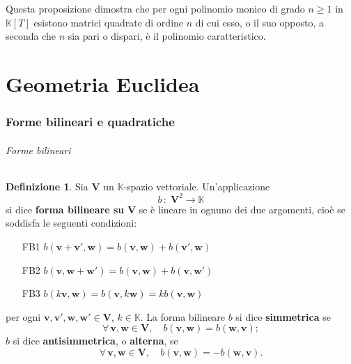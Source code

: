 \documentclass{article}
\theoremstyle{plain}
\theoremstyle{definition}
\newtheorem{defn}{Definizione}[section]
\theoremstyle{remark}
\begin{document}
Questa proposizione dimostra che per ogni polinomio monico di grado $n \geq 1$ in $\mathbb{K}[T]$ esistono 
matrici quadrate di ordine $n$ di cui esso, o il suo opposto, a seconda che $n$ sia pari o dispari, è il 
polinomio caratteristico.

\newpage
\part{Geometria Euclidea}
\newpage

\newpage
\section{Forme bilineari e quadratiche}
\vspace{20pt}

\paragraph{Forme bilineari}
\begin{bxthm}
\begin{defn}
Sia \( \mathbf{V} \) un \( \mathbb{K} \)-spazio vettoriale. Un'applicazione
\[
b \,:\; \mathbf{V}^2 \rightarrow \mathbb{K}
\]
si dice \textbf{forma bilineare su} \( \mathbf{V} \) se è lineare in ognuno dei due argomenti, cioè se soddisfa 
le seguenti condizioni:
\begin{itemize}
    \item[FB1] \( b(\mathbf{v} + \mathbf{v}', \mathbf{w}) = b(\mathbf{v}, \mathbf{w}) + b(\mathbf{v}', \mathbf{w}) \)
    \item[FB2] \( b(\mathbf{v}, \mathbf{w} + \mathbf{w}') = b(\mathbf{v}, \mathbf{w}) + b(\mathbf{v}, \mathbf{w}') \)
    \item[FB3] \( b(k\mathbf{v}, \mathbf{w}) = b(\mathbf{v}, k\mathbf{w}) = kb(\mathbf{v}, \mathbf{w}) \)
\end{itemize}
per ogni \( \mathbf{v}, \mathbf{v}', \mathbf{w}, \mathbf{w}' \in \mathbf{V},\, k \in \mathbb{K} \).
La forma bilineare \( b \) si dice \textbf{simmetrica} se
\[
\forall\,\mathbf{v}, \mathbf{w} \in \mathbf{V},\quad b(\mathbf{v}, \mathbf{w}) = b(\mathbf{w}, \mathbf{v}) ;
\]
\( b \) si dice \textbf{antisimmetrica}, o \textbf{alterna}, se
\[
\forall\,\mathbf{v}, \mathbf{w} \in \mathbf{V},\quad b(\mathbf{v}, \mathbf{w}) = -b(\mathbf{w}, \mathbf{v}) .
\]
\end{defn}
\end{bxthm}

\vspace{10pt}
\end{document}

